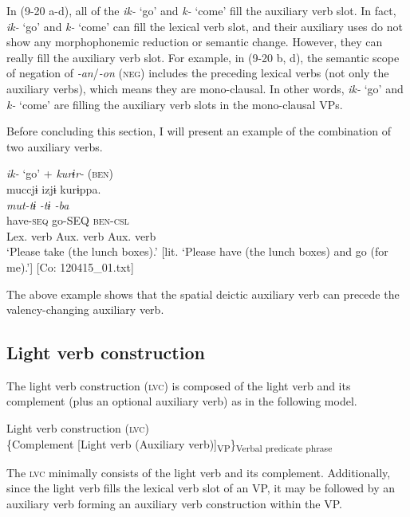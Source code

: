In (9-20 a-d), all of the \textit{ik-} ‘go’ and \textit{k-} ‘come’ fill the auxiliary verb slot. In fact, \textit{ik-} ‘go’ and \textit{k-} ‘come’ can fill the lexical verb slot, and their auxiliary uses do not show any morphophonemic reduction or semantic change. However, they can really fill the auxiliary verb slot. For example, in (9-20 b, d), the semantic scope of negation of \textit{{}-an}/\textit{{}-on} (\textsc{neg}) includes the preceding lexical verbs (not only the auxiliary verbs), which means they are mono-clausal. In other words, \textit{ik-} ‘go’ and \textit{k-} ‘come’ are filling the auxiliary verb slots in the mono-clausal VPs.

Before concluding this section, I will present an example of the combination of two auxiliary verbs.

\ea   \textit{ik-} ‘go’ + \textit{kurɨr-} (\textsc{ben}) \label{ex:9.21}\\
 \gllll  muccjɨ  izjɨ  kurɨppa.\\
    \textit{mut-tɨ}  \textit{-tɨ  -ba}\\
    have-\textsc{seq}  go-SEQ  \textsc{ben}-\textsc{csl}\\
    Lex. verb  Aux. verb  Aux. verb\\
    \glt     ‘Please take (the lunch boxes).’ [lit. ‘Please have (the lunch boxes) and go (for me).’] [Co: 120415\_01.txt]
\z

The above example shows that the spatial deictic auxiliary verb can precede the valency-changing auxiliary verb.

\subsection{Light verb construction}\label{sec:9.1.2}

The light verb construction (\textsc{lvc}) is composed of the light verb and its complement (plus an optional auxiliary verb) as in the following model.

\ea   Light verb construction (\textsc{lvc}) \label{ex:9.22}\\
  \{Complement \hspace{\tabcolsep} [Light verb \hspace{\tabcolsep} (Auxiliary verb)]\textsubscript{VP}\}\textsubscript{Verbal predicate phrase}
\z

The \textsc{lvc} minimally consists of the light verb and its complement. Additionally, since the light verb fills the lexical verb slot of an VP, it may be followed by an auxiliary verb forming an auxiliary verb construction within the VP.

